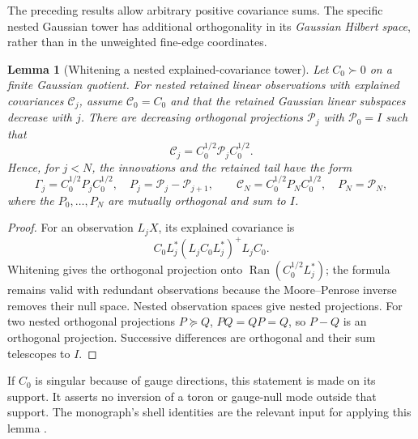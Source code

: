 \documentclass[11pt,a4paper]{article}
\newtheorem{lemma}[lemma]{Lemma}
\theoremstyle{definition}
\theoremstyle{remark}
\DeclareMathOperator{\Ran}{Ran}
\newcommand{\src}[2]{\cite[#2]{#1}}
\begin{document}
The preceding results allow arbitrary positive covariance sums. The
specific nested Gaussian tower has additional orthogonality in its
\emph{Gaussian Hilbert space}, rather than in the unweighted fine-edge
coordinates.

\begin{lemma}[Whitening a nested explained-covariance tower]
\label{lem:v1-projectors}
Let $C_0\succ0$ on a finite Gaussian quotient. For nested retained linear
observations with explained covariances $\mathcal C_j$, assume
$\mathcal C_0=C_0$ and that the retained Gaussian linear subspaces decrease
with $j$. There are decreasing orthogonal projections $\mathcal P_j$
with $\mathcal P_0=I$ such that
\[
 \mathcal C_j=C_0^{1/2}\mathcal P_jC_0^{1/2}.
\]
Hence, for $j<N$, the innovations and the retained tail have the form
\begin{equation}\label{eq:v1-Pj}
 \Gamma_j=C_0^{1/2}P_jC_0^{1/2},\quad
 P_j=\mathcal P_j-\mathcal P_{j+1},\qquad
 \mathcal C_N=C_0^{1/2}P_NC_0^{1/2},\quad P_N=\mathcal P_N,
\end{equation}
where the $P_0,\ldots,P_N$ are mutually orthogonal and sum to $I$.
\end{lemma}
\begin{proof}
For an observation $L_jX$, its explained covariance is
\[
 C_0L_j^*(L_jC_0L_j^*)^+L_jC_0.
\]
Whitening gives the orthogonal projection onto
$\Ran(C_0^{1/2}L_j^*)$; the formula remains valid with redundant
observations because the Moore--Penrose inverse removes their null
space. Nested observation spaces give nested projections. For two
nested orthogonal projections $P\succeq Q$, $PQ=QP=Q$, so $P-Q$ is an
orthogonal projection. Successive differences are orthogonal and their
sum telescopes to $I$.
\end{proof}

If $C_0$ is singular because of gauge directions, this statement is made
on its support. It asserts no inversion of a toron or gauge-null mode
outside that support. The monograph's shell identities are the relevant
input for applying this lemma \src{YM3}{\texttt{thm:shells}}.
\end{document}
